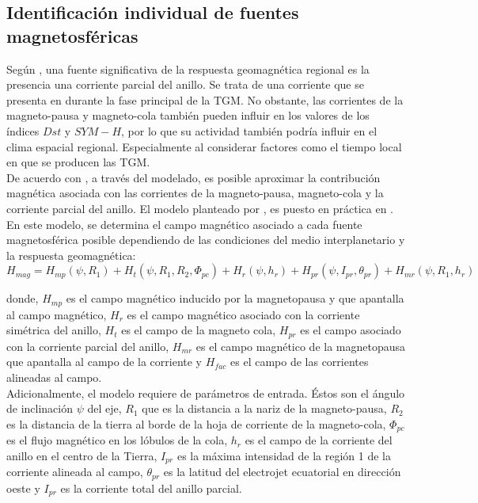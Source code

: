 \documentclass[preprint,12pt]{article}
\begin{document}
\subsection{Identificación individual de fuentes magnetosféricas}
Según \cite{partialringcurrentidx}, una fuente significativa de la respuesta geomagnética regional es la presencia una corriente parcial del anillo. Se trata de una corriente que se presenta en durante la fase principal de la TGM. No obstante, las corrientes de la magneto-pausa y magneto-cola también pueden influir en los valores de los índices $Dst$ y $SYM-H$, por lo que su actividad también podría influir en el clima espacial regional. Especialmente al considerar factores como el tiempo local en que se producen las TGM.\\


De acuerdo con \cite{partialringcurrentasym}, a través del modelado, es posible aproximar la contribución magnética asociada con las corrientes de la magneto-pausa, magneto-cola y la corriente parcial del anillo. El modelo planteado por \cite{parabmagnet}, es puesto en práctica en \cite{magnetosphericcurrentscontr, partialringcurrentasym}. En este modelo, se determina el campo magnético asociado a cada fuente magnetosférica posible dependiendo de las condiciones del medio interplanetario y la respuesta geomagnética:\\ 

\begin{equation}
	H_{mag} = H_{mp}(\psi, R_1)+H_t(\psi, R_1, R_2, \Phi_{pc})+H_r(\psi, h_r) + H_{pr}(\psi, I_{pr}, \theta_{pr}) + H_{mr}(\psi, R_1, h_r)
\end{equation}	

\noindent donde, $H_{mp}$ es el campo magnético inducido por la magnetopausa y que apantalla al campo magnético, $H_r$ es el campo magnético asociado con la corriente simétrica del anillo, $H_t$ es el campo de la magneto cola, $H_{pr}$ es el campo asociado con la corriente parcial del anillo, $H_{mr}$ es el campo magnético de la magnetopausa que apantalla al campo de la corriente y $H_{fac}$ es el campo de las corrientes alineadas al campo.\\

Adicionalmente, el modelo requiere de parámetros de entrada. Éstos son el ángulo de inclinación $\psi$ del eje, $R_1$ que es la distancia a la nariz de la magneto-pausa, $R_2$ es la distancia de la tierra al borde de la hoja de corriente de la magneto-cola, $\Phi_{pc}$ es el flujo magnético en los lóbulos de la cola, $h_r$ es el campo de la corriente del anillo en el centro de la Tierra, $I_{pr}$ es la máxima intensidad de la región 1 de la corriente alineada al campo, $\theta_{pr}$ es la latitud del electrojet ecuatorial en dirección oeste y $I_{pr}$ es la corriente total del anillo parcial.\\
\end{document}
